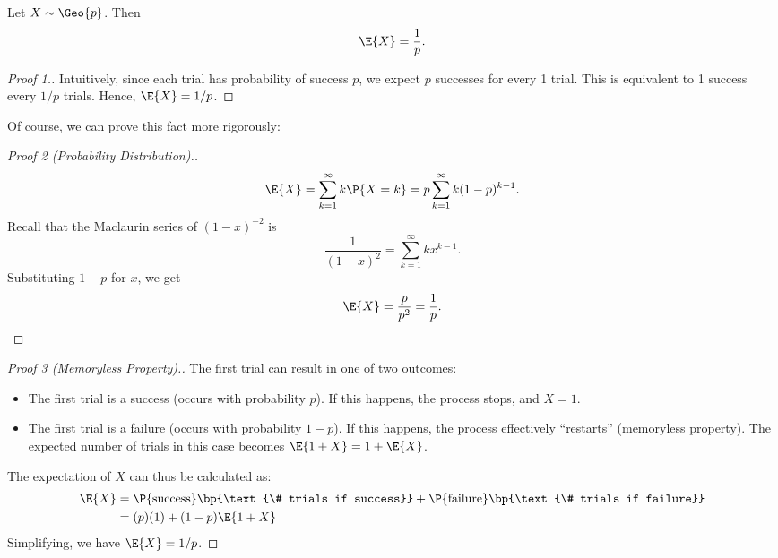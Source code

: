\begin{proposition}
    Let $X \sim \Geo{p}$. Then \[\E{X} = \frac1p.\]
\end{proposition}
\begin{proof}[Proof 1.]
    Intuitively, since each trial has probability of success $p$, we expect $p$ successes for every 1 trial. This is equivalent to 1 success every $1/p$ trials. Hence, $\E{X} = 1/p$.
\end{proof}
Of course, we can prove this fact more rigorously:
\begin{proof}[Proof 2 (Probability Distribution).]
    \[\E{X} = \sum_{k = 1}^\infty k \P{X = k} = p \sum_{k = 1}^\infty k (1-p)^{k-1}.\] Recall that the Maclaurin series of $(1 - x)^{-2}$ is \[\frac1{(1-x)^{2}} = \sum_{k = 1}^\infty k x^{k-1}.\] Substituting $1-p$ for $x$, we get \[\E{X} = \frac{p}{p^2} = \frac{1}{p}.\]
\end{proof}
\begin{proof}[Proof 3 (Memoryless Property).]
    The first trial can result in one of two outcomes:
    \begin{itemize}
        \item The first trial is a success (occurs with probability $p$). If this happens, the process stops, and $X = 1$.
        \item The first trial is a failure (occurs with probability $1-p$). If this happens, the process effectively ``restarts'' (memoryless property). The expected number of trials in this case becomes $\E{1 + X} = 1 + \E{X}$.
    \end{itemize}

    The expectation of $X$ can thus be calculated as:
    \begin{align*}
        \E{X} &= \P{\text{success}} \bp{\text{\# trials if success}} + \P{\text{failure}} \bp{\text{\# trials if failure}}\\
        &= (p)(1) + (1-p)\E{1 + X}
    \end{align*}
    Simplifying, we have $\E{X} = 1/p$.
\end{proof}

